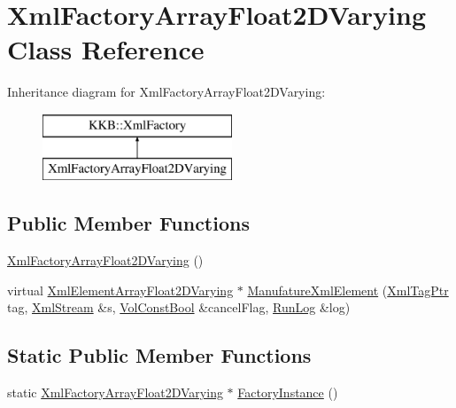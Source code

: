 \hypertarget{class_xml_factory_array_float2_d_varying}{}\section{Xml\+Factory\+Array\+Float2\+D\+Varying Class Reference}
\label{class_xml_factory_array_float2_d_varying}
Inheritance diagram for Xml\+Factory\+Array\+Float2\+D\+Varying\+:\begin{figure}[H]
\begin{center}
\leavevmode
\includegraphics[height=2.000000cm]{class_xml_factory_array_float2_d_varying}
\end{center}
\end{figure}
\subsection*{Public Member Functions}
\begin{DoxyCompactItemize}
\item 
\hyperlink{class_xml_factory_array_float2_d_varying_ac3b7c56e03cae55381fae39e31bd748d}{Xml\+Factory\+Array\+Float2\+D\+Varying} ()
\item 
virtual \hyperlink{class_k_k_b_1_1_xml_element_array_float2_d_varying}{Xml\+Element\+Array\+Float2\+D\+Varying} $\ast$ \hyperlink{class_xml_factory_array_float2_d_varying_ae9c44b3ef7780a50759574d12c85244f}{Manufature\+Xml\+Element} (\hyperlink{namespace_k_k_b_a9253a3ea8a5da18ca82be4ca2b390ef0}{Xml\+Tag\+Ptr} tag, \hyperlink{class_k_k_b_1_1_xml_stream}{Xml\+Stream} \&s, \hyperlink{namespace_k_k_b_a7d390f568e2831fb76b86b56c87bf92f}{Vol\+Const\+Bool} \&cancel\+Flag, \hyperlink{class_k_k_b_1_1_run_log}{Run\+Log} \&log)
\end{DoxyCompactItemize}
\subsection*{Static Public Member Functions}
\begin{DoxyCompactItemize}
\item 
static \hyperlink{class_xml_factory_array_float2_d_varying}{Xml\+Factory\+Array\+Float2\+D\+Varying} $\ast$ \hyperlink{class_xml_factory_array_float2_d_varying_aab9ef83179deedd30aa739bd63798702}{Factory\+Instance} ()
\end{DoxyCompactItemize}
